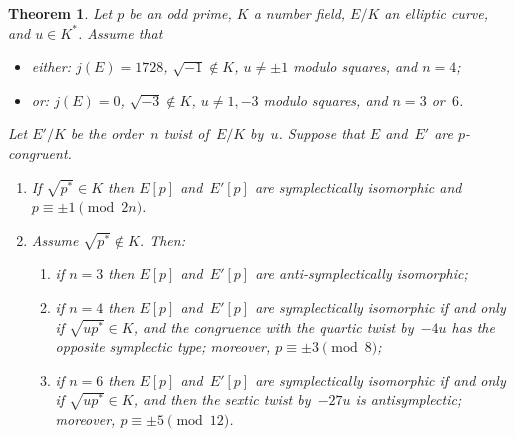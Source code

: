 \documentclass[12pt, reqno]{amsart}
\numberwithin{equation}{section}
\newtheorem{theorem}{Theorem}[section]
\theoremstyle{definition}
\theoremstyle{remark}
\begin{document}
\begin{theorem}\label{T:typeHigher}
  Let $p$ be an odd prime, $K$ a number field, $E/K$ an elliptic
  curve, and $u\in K^*$.  Assume that
  \begin{itemize}
    \item \emph{either:} $j(E)=1728$, $\sqrt{-1}\notin K$, $u\not=\pm1$
      modulo squares, and $n=4$;
    \item \emph{or:} $j(E)=0$, $\sqrt{-3}\notin K$, $u\not=1,-3$
      modulo squares, and $n=3$ or~$6$.
  \end{itemize}

 Let $E'/K$ be the order~$n$ twist of~$E/K$ by~$u$.
 Suppose that $E$ and~$E'$ are $p$-congruent.
\begin{enumerate}
\item If $\sqrt{p^*}\in K$ then $E[p]$ and~$E'[p]$ are symplectically isomorphic
and $p\equiv\pm1\pmod{2n}$.
\item Assume $\sqrt{p^*}\notin K$. Then:
\begin{enumerate}
\item if $n=3$ then $E[p]$ and~$E'[p]$ are anti-symplectically isomorphic;
\item if $n=4$ then $E[p]$ and~$E'[p]$ are symplectically isomorphic if and only if $\sqrt{up^*}\in K$, and the congruence with the quartic twist by~$-4u$ has the opposite symplectic type; 
moreover, $p\equiv\pm3\pmod8$;
\item if $n=6$ then $E[p]$ and~$E'[p]$ are symplectically isomorphic if and only if
  $\sqrt{up^*}\in K$, and then the sextic twist by~$-27u$ is
  antisymplectic; moreover, $p\equiv\pm5\pmod{12}$.
\end{enumerate}
\end{enumerate}
\end{theorem}
\end{document}
